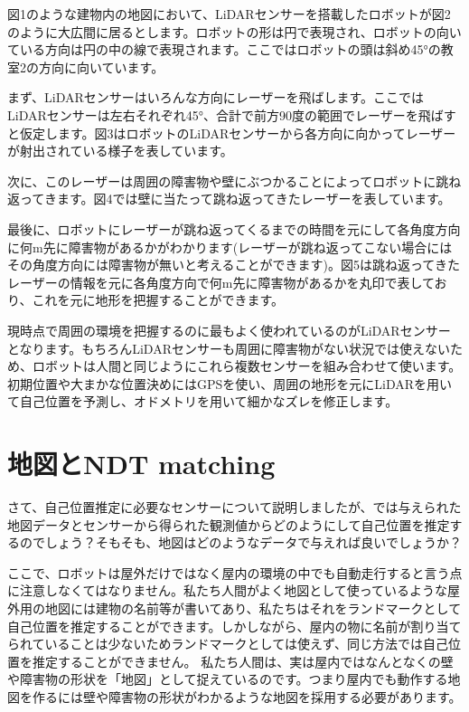 \documentclass[12pt]{article}
\begin{document}
図1のような建物内の地図において、LiDARセンサーを搭載したロボットが図2のように大広間に居るとします。ロボットの形は円で表現され、ロボットの向いている方向は円の中の線で表現されます。ここではロボットの頭は斜め45°の教室2の方向に向いています。

まず、LiDARセンサーはいろんな方向にレーザーを飛ばします。ここではLiDARセンサーは左右それぞれ45°、合計で前方90度の範囲でレーザーを飛ばすと仮定します。図3はロボットのLiDARセンサーから各方向に向かってレーザーが射出されている様子を表しています。

次に、このレーザーは周囲の障害物や壁にぶつかることによってロボットに跳ね返ってきます。図4では壁に当たって跳ね返ってきたレーザーを表しています。

最後に、ロボットにレーザーが跳ね返ってくるまでの時間を元にして各角度方向に何m先に障害物があるかがわかります(レーザーが跳ね返ってこない場合にはその角度方向には障害物が無いと考えることができます)。図5は跳ね返ってきたレーザーの情報を元に各角度方向で何m先に障害物があるかを丸印で表しており、これを元に地形を把握することができます。

現時点で周囲の環境を把握するのに最もよく使われているのがLiDARセンサーとなります。もちろんLiDARセンサーも周囲に障害物がない状況では使えないため、ロボットは人間と同じようにこれら複数センサーを組み合わせて使います。初期位置や大まかな位置決めにはGPSを使い、周囲の地形を元にLiDARを用いて自己位置を予測し、オドメトリを用いて細かなズレを修正します。

\section{地図とNDT matching}

さて、自己位置推定に必要なセンサーについて説明しましたが、では与えられた地図データとセンサーから得られた観測値からどのようにして自己位置を推定するのでしょう？そもそも、地図はどのようなデータで与えれば良いでしょうか？

ここで、ロボットは屋外だけではなく屋内の環境の中でも自動走行すると言う点に注意しなくてはなりません。私たち人間がよく地図として使っているような屋外用の地図には建物の名前等が書いてあり、私たちはそれをランドマークとして自己位置を推定することができます。しかしながら、屋内の物に名前が割り当てられていることは少ないためランドマークとしては使えず、同じ方法では自己位置を推定することができません。
私たち人間は、実は屋内ではなんとなくの壁や障害物の形状を「地図」として捉えているのです。つまり屋内でも動作する地図を作るには壁や障害物の形状がわかるような地図を採用する必要があります。
\end{document}
